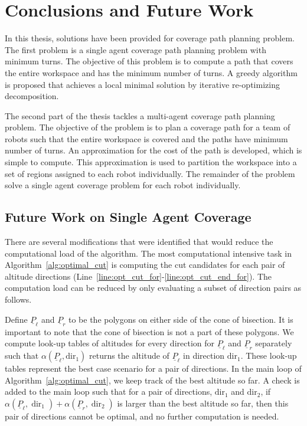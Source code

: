 \documentclass[../main.tex]{subfiles}
\begin{document}
\chapter{Conclusions and Future Work}
\label{chapter:future_work}

In this thesis, solutions have been provided for coverage path planning problem. The first problem is a single agent coverage path planning problem with minimum turns. The objective of this problem is to compute a path that covers the entire workspace and has the minimum number of turns. A greedy algorithm is proposed that achieves a local minimal solution by iterative re-optimizing decomposition. 

The second part of the thesis tackles a multi-agent coverage path planning problem. The objective of the problem is to plan a coverage path for a team of robots such that the entire workspace is covered and the paths have minimum number of turns. An approximation for the cost of the path is developed, which is simple to compute. This approximation is used to partition the workspace into a set of regions assigned to each robot individually. The remainder of the problem solve a single agent coverage problem for each robot individually.

\section{Future Work on Single Agent Coverage}
\label{section:future_single}

There are several modifications that were identified that would reduce the computational load of the algorithm. The most computational intensive task in Algorithm~\ref{alg:optimal_cut} is computing the cut candidates for each pair of altitude directions (Line~\ref{line:opt_cut_for}-\ref{line:opt_cut_end_for}). The computation load can be reduced by only evaluating a subset of direction pairs as follows.

Define $\underline{P}_{\ell}$ and $\underline{P}_{r}$ to be the polygons on either side of the cone of bisection. It is important to note that the cone of bisection is not a part of these polygons. We compute look-up tables of altitudes for every direction for $\underline{P}_{\ell}$ and $\underline{P}_{r}$ separately such that $\alpha(\underline{P}_{\ell},\text{dir}_1)$ returns the altitude of $\underline{P}_{\ell}$ in direction $\text{dir}_1$. These look-up tables represent the best case scenario for a pair of directions. In the main loop of Algorithm~\ref{alg:optimal_cut}, we keep track of the best altitude so far. A check is added to the main loop such that for a pair of directions, $\text{dir}_1$ and $\text{dir}_2$, if $\alpha(\underline{P}_{\ell},\operatorname{dir}_1)+\alpha(\underline{P}_{r},\operatorname{dir}_2)$ is larger than the best altitude so far, then this pair of directions cannot be optimal, and no further computation is needed.
\end{document}
